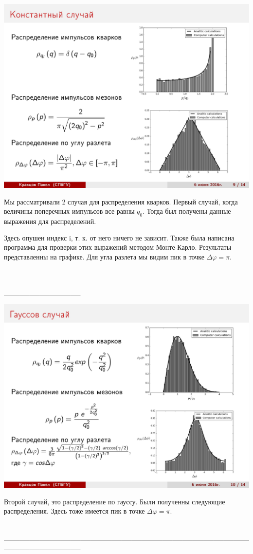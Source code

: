 \documentclass[14pt]{article}
\renewcommand{\phi}{\varphi}
\renewcommand{\line}{\\ \_\_\_\_\_\_\_\_\_\_\_\_\_\_\_\_\_\_\_\_\_\_\_\_\_\_\_\_\_\_\_\_\_\_\_\_\_\_\_\_\_\_\_\_\_\_\_\_\_\_\_\_\_\_\_\_\_\_\_\_\_\_\_ \\ }
\begin{document}
\begin{minipage}[h]{0.5\linewidth}
\includegraphics[width=1\linewidth]{page-09.jpg}
\end{minipage}
\begin{minipage}[h]{0.45\linewidth}
Мы рассматривали 2 случая для распределения кварков. Первый случай, когда величины поперечных импульсов все равны $q_0$. Тогда был получены данные выражения для распределений.

Здесь опушен индекс i, т. к. от него ничего не зависит. Также была написана программа для проверки этих выражений методом Монте-Карло. Результаты представленны на графике. Для угла разлета мы видим пик в точке $\Delta \phi = \pi$.
\end{minipage}
\line

\newpage
$$$$
$$$$
$$$$
$$$$

\begin{minipage}[h]{0.5\linewidth}
\includegraphics[width=1\linewidth]{page-10.jpg}
\end{minipage}
\begin{minipage}[h]{0.45\linewidth}
Второй случай, это распределение по гауссу. Были полученны следующие распределения. Здесь тоже имеется пик в точке $\Delta \phi = \pi$.
\end{minipage}
\line
\end{document}
